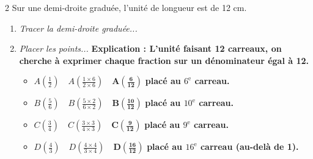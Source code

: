 \documentclass[a4paper]{book}
\begin{document}
{        
    \begin{exerciceNote}{2}
        Sur une demi-droite graduée, l'unité de longueur est de 12 cm.
        \begin{enumerate}
            \item \textit{Tracer la demi-droite graduée...}
            \item \textit{Placer les points...} \textbf{Explication : L'unité faisant 12 carreaux, on cherche à exprimer chaque fraction sur un dénominateur égal à 12.}
            \begin{itemize}
                \item $A\left(\frac{1}{2}\right) \quad  A\left(\frac{1 \times 6}{2 \times 6}\right) \quad  \mathbf{A\left(\frac{6}{12}\right)}$ \textrightarrow{} \textbf{placé au $6^{\text{e}}$ carreau.}
                
                \item $B\left(\frac{5}{6}\right) \quad  B\left(\frac{5 \times 2}{6 \times 2}\right) \quad  \mathbf{B\left(\frac{10}{12}\right)}$ \textrightarrow{} \textbf{placé au $10^{\text{e}}$ carreau.}
                
                \item $C\left(\frac{3}{4}\right) \quad  C\left(\frac{3 \times 3}{4 \times 3}\right) \quad  \mathbf{C\left(\frac{9}{12}\right)}$ \textrightarrow{} \textbf{placé au $9^{\text{e}}$ carreau.}
                
                \item $D\left(\frac{4}{3}\right) \quad  D\left(\frac{4 \times 4}{3 \times 4}\right) \quad  \mathbf{D\left(\frac{16}{12}\right)}$ \textrightarrow{} \textbf{placé au $16^{\text{e}}$ carreau (au-delà de 1).}
            \end{itemize}

            \begin{center}
\end{center}
\end{enumerate}
\end{exerciceNote}}
\end{document}
